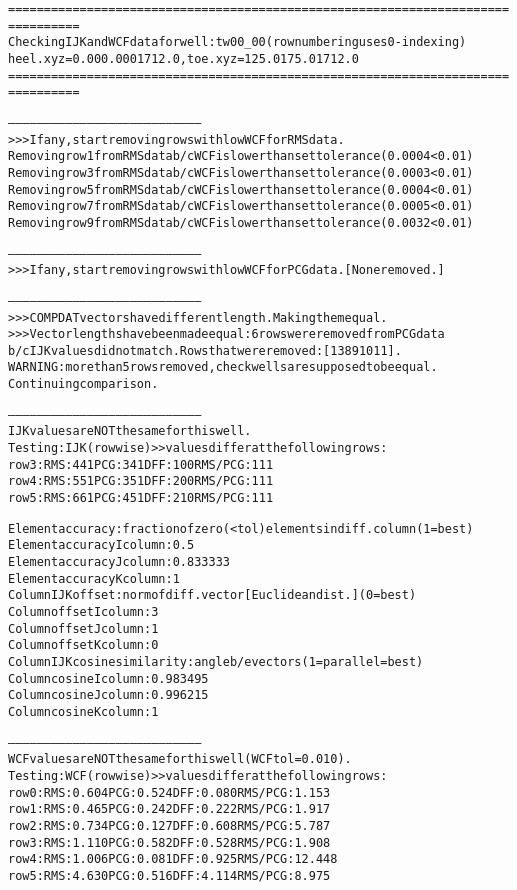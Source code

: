 \begin{alltt}
================================================================================
Checking IJK and WCF data for well: tw00_00 (row numbering uses 0-indexing)
heel.xyz = 0.00 0.000 1712.0, toe.xyz = 125.0 175.0 1712.0
================================================================================

--------------------------------------------------------------------------------
>>> If any, start removing rows with low WCF for RMS data.
Removing row 1 from RMS data b/c WCF is lower than set tolerance (0.0004 < 0.01)
Removing row 3 from RMS data b/c WCF is lower than set tolerance (0.0003 < 0.01)
Removing row 5 from RMS data b/c WCF is lower than set tolerance (0.0004 < 0.01)
Removing row 7 from RMS data b/c WCF is lower than set tolerance (0.0005 < 0.01)
Removing row 9 from RMS data b/c WCF is lower than set tolerance (0.0032 < 0.01)

--------------------------------------------------------------------------------
>>> If any, start removing rows with low WCF for PCG data. [None removed.]

--------------------------------------------------------------------------------
>>> COMPDAT vectors have different length. Making them equal.
>>> Vector lengths have been made equal: 6 rows were removed from PCG data
b/c IJK values did not match. Rows that were removed: [1 3 8 9 10 11].
WARNING: more than 5 rows removed, check wells are supposed to be equal. 
Continuing comparison.

--------------------------------------------------------------------------------
IJK values are NOT the same for this well.
Testing: IJK (rowwise) >> values differ at the following rows:
row   3:  RMS:  4  4  1 PCG:  3  4  1 DFF:  1  0  0 RMS/PCG:  1  1  1 
row   4:  RMS:  5  5  1 PCG:  3  5  1 DFF:  2  0  0 RMS/PCG:  1  1  1 
row   5:  RMS:  6  6  1 PCG:  4  5  1 DFF:  2  1  0 RMS/PCG:  1  1  1 

Element accuracy: fraction of zero (<tol) elements in diff. column (1=best)
Element accuracy I column: 0.5
Element accuracy J column: 0.833333
Element accuracy K column: 1
Column IJK offset: norm of diff. vector [Euclidean dist.]  (0=best)
Column offset I column:  3
Column offset J column:  1
Column offset K column:  0
Column IJK cosine similarity: angle b/e vectors (1=parallel=best)
Column cosine I column: 0.983495
Column cosine J column: 0.996215
Column cosine K column: 1

--------------------------------------------------------------------------------
WCF values are NOT the same for this well (WCF tol = 0.010).
Testing: WCF (rowwise) >> values differ at the following rows:
row   0:  RMS:   0.604    PCG:   0.524    DFF:   0.080    RMS/PCG:   1.153    
row   1:  RMS:   0.465    PCG:   0.242    DFF:   0.222    RMS/PCG:   1.917    
row   2:  RMS:   0.734    PCG:   0.127    DFF:   0.608    RMS/PCG:   5.787    
row   3:  RMS:   1.110    PCG:   0.582    DFF:   0.528    RMS/PCG:   1.908    
row   4:  RMS:   1.006    PCG:   0.081    DFF:   0.925    RMS/PCG:  12.448    
row   5:  RMS:   4.630    PCG:   0.516    DFF:   4.114    RMS/PCG:   8.975    


\end{alltt}
